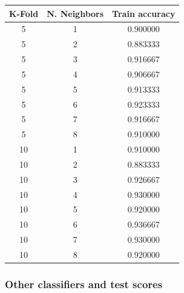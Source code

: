 \documentclass{article}
\begin{document}
\begin{table}[htb]
\begin{tabular}{|c|c|c|}
\hline
\textbf{K-Fold} & \textbf{N. Neighbors} & \textbf{Train accuracy} \\ \hline
5               & 1           & 0.900000           \\ \hline
5               & 2           & 0.883333           \\ \hline
5               & 3           & 0.916667           \\ \hline
5               & 4           & 0.906667           \\ \hline
5               & 5           & 0.913333           \\ \hline
5               & 6           & 0.923333           \\ \hline
5               & 7           & 0.916667           \\ \hline
5               & 8           & 0.910000           \\ \hline
10              & 1           & 0.910000           \\ \hline
10              & 2           & 0.883333           \\ \hline
10              & 3           & 0.926667           \\ \hline
10              & 4           & 0.930000           \\ \hline
10              & 5           & 0.920000           \\ \hline
\rowcolor[HTML]{34FF34}
10              & 6           & 0.936667           \\ \hline
10              & 7           & 0.930000           \\ \hline
10              & 8           & 0.920000           \\ \hline
\end{tabular}
\end{table}

\pagebreak

\subsubsection{Other classifiers and test scores}
\end{document}
